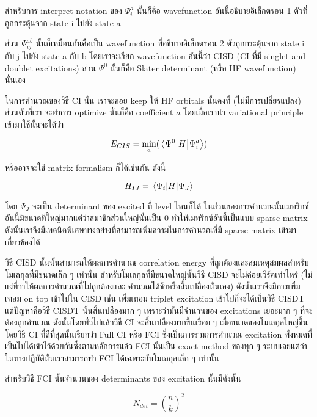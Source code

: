 สำหรับการ interpret notation ของ $\Psi^{a}_{i}$ นั้นก็คือ wavefunction อันนี้อธิบายอิเล็กตรอน 1 
ตัวที่ถูกกระตุ้นจาก state i ไปยัง state a 

ส่วน $\Psi^{ab}_{ij}$ นั้นก็เหมือนกันคือเป็น wavefunction ที่อธิบายอิเล็กตรอน 2 ตัวถูกกระตุ้นจาก 
state i กับ j ไปยัง state a กับ b โดยเราจะเรียก wavefunction อันนี้ว่า CISD (CI ที่มี singlet 
and doublet excitations) ส่วน $\Psi^{0}$ นั้นก็คือ Slater determinant (หรือ HF wavefunction) 
นั่นเอง 

ในการคำนวณของวิธี CI นั้น เราจะคอย keep ให้ HF orbitals นั้นคงที่ (ไม่มีการเปลี่ยรแปลง) ส่วนตัวที่เรา%
จะทำการ optimize นั่นก็คือ coefficient $a$ โดยเมื่อเรานำ variational principle เข้ามาใช้นั้นจะได้ว่า 

\begin{equation}
    E_{CIS} = \min_{a} ( \mel{\Psi^{0}}{H}{\Psi^{a}_{i}} )
\end{equation}

\noindent หรืออาจจะใช้ matrix formalism ก็ได้เช่นกัน ดังนี้

\begin{equation}
    H_{IJ} = \mel{\Psi_{i}}{H}{\Psi_{J}}
\end{equation}

โดย $\Psi_{J}$ จะเป็น determinant ของ excited ที่ level ไหนก็ได้ ในส่วนของการคำนวณนั้นเมทริกซ์%
อันนี้มีขนาดที่ใหญ่มากแต่ว่าสมาชิกส่วนใหญ่นั้นเป็น 0 ทำให้เมทริกซ์อันนี้เป็นแบบ sparse matrix 
ดังนั้นเราจึงมีเทคนิคพิเศษบางอย่างที่สามารถเพิ่มความในการคำนวณที่มี sparse matrix เข้ามาเกี่ยวข้องได้

วิธี CISD นั้นนั้นสามารถให้ผลการคำนวณ correlation energy ที่ถูกต้องและสมเหตุสมผลสำหรับโมเลกุลที่มีขนาดเล็ก ๆ 
เท่านั้น สำหรับโมเลกุลที่มีขนาดใหญ่นั้นวิธี CISD จะไม่ค่อยเวิร์คเท่าไหร่ (ไม่แง่ที่ว่าให้ผลการคำนวณที่ไม่ถูกต้องและ%
คำนวณได้ช้าหรือสิ้นเปลืองนั่นเอง) ดังนั้นเราจึงมีการเพิ่มเทอม on top เข้าไปใน CISD เช่น เพิ่มเทอม triplet 
excitation เข้าไปก็จะได้เป็นวิธี CISDT แต่ปัญหาคือวิธี CISDT นั้นสิ้นเปลืองมาก ๆ เพราะว่ามันมีจำนวนของ 
excitations เยอะมาก ๆ ที่จะต้องถูกคำนวณ ดังนั้นโดยทั่วไปแล้ววิธี CI จะสิ้นเปลืองมากขึ้นเรื่อย ๆ 
เมื่อขนาดของโมเลกุลใหญ่ขึ้น โดยวิธี CI ที่ดีที่สุดนั้นเรียกว่า Full CI หรือ FCI ซึ่งเป็นการรวมการคำนวณ 
excitation ทั้งหมดที่เป็นไปได้เข้าไว้ด้วยกันซึ่งตามหลักการแล้ว FCI นั้นเป็น exact method ของทุก ๆ 
ระบบเลยแต่ว่าในทางปฏิบัตินั้นเราสามารถทำ FCI ได้เฉพาะกับโมเลกุลเล็ก ๆ เท่านั้น 

สำหรับวิธี FCI นั้นจำนวนของ determinants ของ excitation นั้นมีดังนั้น 

\begin{equation}
    N_{det} = \binom{n}{k}^{2}
\end{equation}

